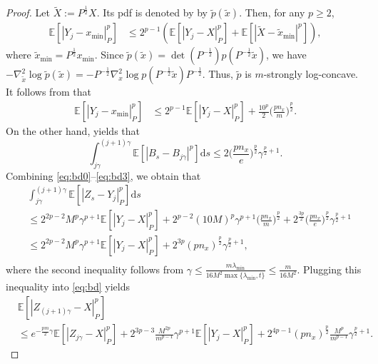 \documentclass[11pt]{article}
\theoremstyle{plain}
\theoremstyle{definition}
\theoremstyle{remark}
\begin{document}
\begin{proof}
Let $\tilde{X} := P^{\frac{1}{2}}X$. Its pdf is denoted by by $ \tilde{p}(\tilde{x})$.
Then, for any $p\geq 2$,
\begin{equation}
\begin{split}
\mathbb{E} [ | Y_j - x_{\min}|_P^p] 
&\leq 2^{p-1} (
\mathbb{E} [ | Y_j - X|_P^p]
+\mathbb{E} [ | \tilde{X} - \tilde{x}_{\min}|^p]
),
\end{split}
\end{equation}
where $\tilde{x}_{\min} = P^{\frac{1}{2}} x_{\min}$. 
Since $\tilde{p}(\tilde{x}) = \det(P^{-\frac{1}{2}}) p (P^{-\frac{1}{2}}\tilde{x})$, we have
$-\nabla^2_{\tilde{x}} \log \tilde{p}(\tilde{x}) = -P^{-\frac{1}{2}} \nabla^2_x \log p(P^{-\frac{1}{2}}\tilde x) P^{-\frac{1}{2}}$.
Thus, $\tilde{p}$ is $m$-strongly log-concave. 
It follows from \cite[Lemma 10]{mazumdar2020thompson} that 
\begin{equation}\label{eq:bd2}
\begin{split}
\mathbb{E} [ | Y_j - x_{\min}|_P^p] & \leq 2^{p-1}\mathbb{E} [ | Y_j - X|_P^p] + \frac{10^p}{2} \big(\frac{pn_x}{m}\big)^{\frac{p}{2}}.
\end{split}
\end{equation}
On the other hand, \cite[Lemma 8]{mazumdar2020thompson} yields that
\begin{equation}\label{eq:bd3}
\int_{j\gamma}^{(j+1)\gamma} \mathbb{E} [
| B_s - B_{j\gamma}|^p
]\mathrm{d}s \leq 2\big(\frac{pn_x}{e}\big)^{\frac{p}{2}} \gamma^{\frac{p}{2}+1}.
\end{equation}
Combining \eqref{eq:bd0}--\eqref{eq:bd3}, we obtain that \begin{equation}
\begin{split}
&\int_{j\gamma}^{(j+1)\gamma} \mathbb{E} [
| Z_s - Y_j |_P^p
]\mathrm{d} s \\
&\leq 
2^{2p-2} M^p \gamma^{p+1} \mathbb{E} [ | Y_j - X |_P^p ] + 2^{p-2}(10 M)^p \gamma^{p+1} \big(\frac{pn_x}{m}\big)^{\frac{p}{2}} +  2^{\frac{3p}{2}}\big(\frac{pn_x}{e}\big)^{\frac{p}{2} }\gamma^{\frac{p}{2}+1}\\
&\leq 2^{2p-2} M^p \gamma^{p+1} \mathbb{E} [ | Y_j - X |_P^p ] + 2^{3p} (pn_x)^{\frac{p}{2}} \gamma^{\frac{p}{2}+1},
\\& 
\end{split}
\end{equation}
where the second inequality follows from $\gamma \leq \frac{m \lambda_{\min}}{16 M^2\max\{\lambda_{\min},t\}} \leq \frac{m}{16 M^2}$. 
Plugging this inequality into \eqref{eq:bd} yields
\begin{align*}
&\mathbb{E} [| Z_{(j+1)\gamma} - X |_P^p ]  \\
&\leq e^{-\frac{pm}{2}  \gamma} \mathbb{E} [ | Z_{j\gamma} - X |_P^p]
+2^{3p-3}\frac{M^{2p}}{m^{p-1}} \gamma^{p+1} \mathbb{E} [ | Y_j - X |_P^p ]
+ 2^{4p-1} (pn_x)^{\frac{p}{2}} \frac{M^p}{m^{p-1} } \gamma^{\frac{p}{2}+1}.
\end{align*}


\end{proof}
\end{document}
